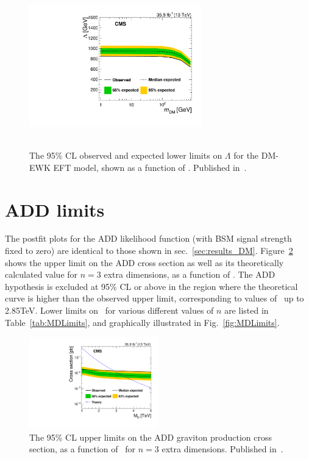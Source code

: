 \begin{figure}[htbp]
\begin{center}
\includegraphics[width=7.5cm,height=7.0cm]{figures/exo16053/Figure_009.pdf}
\caption{The 95\% CL observed and expected lower limits on $\Lambda$ for the DM-EWK EFT model, shown as a function of \mdm.
Published in~\cite{ref:JHEP02(2019)074}.}
\label{fig:DMEWKlimits}
\end{center}
\end{figure}

\section{ADD limits} \label{sec:results_ADD}
The postfit plots for the ADD likelihood function (with BSM signal strength fixed to zero) are identical
to those shown in sec.~\ref{sec:results_DM}. Figure~\ref{fig:ADDLimits} shows the upper limit on the ADD cross section as well as its
theoretically calculated value for $n=3$ extra dimensions, as a function of \mD. The ADD hypothesis is excluded at 95\% CL or above in the region
where the theoretical curve is higher than the observed upper limit, corresponding to values of \mD\ up to 2.85\unit{TeV}.
Lower limits on \mD\ for various different values of $n$ are listed in Table~\ref{tab:MDLimits}, and graphically illustrated in Fig.~\ref{fig:MDLimits}.

\begin{figure}[htbp]
  \begin{center}
    \includegraphics[width=0.5\textwidth]{figures/exo16053/Figure_010.pdf}
    \caption{The 95\% CL upper limits on the ADD graviton production cross section, as a function of \mD\, for $n=3$ extra dimensions.
    Published in~\cite{ref:JHEP02(2019)074}.}
    \label{fig:ADDLimits}
  \end{center}
\end{figure}

